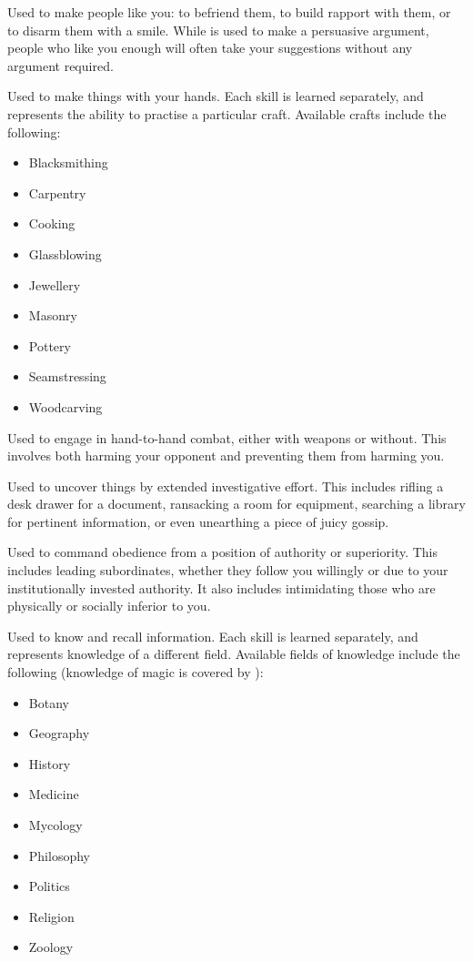 Used to make people like you: to befriend them, to build rapport with them, or to disarm them with a smile.
While  is used to make a persuasive argument, people who like you enough will often take your suggestions without any argument required.


Used to make things with your hands.
Each  skill is learned separately, and represents the ability to practise a particular craft.
Available crafts include the following:
\begin{itemize}
	\item Blacksmithing
	\item Carpentry
	\item Cooking
	\item Glassblowing
	\item Jewellery
	\item Masonry
	\item Pottery
	\item Seamstressing
	\item Woodcarving
\end{itemize}


Used to engage in hand-to-hand combat, either with weapons or without.
This involves both harming your opponent and preventing them from harming you.


Used to uncover things by extended investigative effort.
This includes rifling a desk drawer for a document, ransacking a room for equipment, searching a library for pertinent information, or even unearthing a piece of juicy gossip.


Used to command obedience from a position of authority or superiority.
This includes leading subordinates, whether they follow you willingly or due to your institutionally invested authority.
It also includes intimidating those who are physically or socially inferior to you.


Used to know and recall information.
Each  skill is learned separately, and represents knowledge of a different field.
Available fields of knowledge include the following (knowledge of magic is covered by {\magicskills}):
\begin{itemize}
	\item Botany
	\item Geography
	\item History
	\item Medicine
	\item Mycology %
	\item Philosophy
	\item Politics
	\item Religion
	\item Zoology
\end{itemize}

